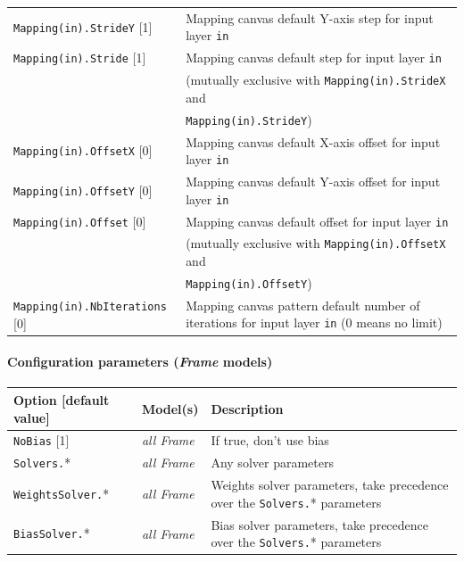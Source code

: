 \documentclass[a4paper,11pt,oneside]{article}
\begin{document}
\begin{center}
\begin{longtable}{| p{5cm} | p{10cm} | }
  \lstinline!Mapping(in).StrideY! [1] & Mapping canvas default Y-axis step
  for input layer \lstinline!in! \\
  \lstinline!Mapping(in).Stride! [1] & Mapping canvas default step
  for input layer \lstinline!in! \\
   & (mutually exclusive with \lstinline!Mapping(in).StrideX! and \\
   & \lstinline!Mapping(in).StrideY!) \\
  \lstinline!Mapping(in).OffsetX! [0] & Mapping canvas default X-axis offset
  for input layer \lstinline!in! \\
  \lstinline!Mapping(in).OffsetY! [0] & Mapping canvas default Y-axis offset
  for input layer \lstinline!in! \\
  \lstinline!Mapping(in).Offset! [0] & Mapping canvas default offset
  for input layer \lstinline!in! \\
   & (mutually exclusive with \lstinline!Mapping(in).OffsetX! and \\
   & \lstinline!Mapping(in).OffsetY!) \\
  \lstinline!Mapping(in).NbIterations! [0] & Mapping canvas pattern default
  number of iterations for input layer \lstinline!in! (0 means no limit) \\
 \hline
\end{longtable}
\end{center}

\paragraph{Configuration parameters (\emph{Frame} models)}

\begin{center}
 \begin{longtable}{| p{4cm} | p{3cm} | p{9cm} | }
 \hline
 Option [default value] & Model(s) & Description\\
 \hline\hline
  \lstinline!NoBias! [1] & \emph{all Frame} & If true, don't use bias \\
  \lstinline!Solvers.!* & \emph{all Frame} & Any solver parameters \\
  \lstinline!WeightsSolver.!* & \emph{all Frame} & Weights solver parameters,
  take precedence over the \lstinline!Solvers.!* parameters \\
  \lstinline!BiasSolver.!* & \emph{all Frame} & Bias solver parameters,
  take precedence over the \lstinline!Solvers.!* parameters \\
 \hline
\end{longtable}
\end{center}
\end{document}
